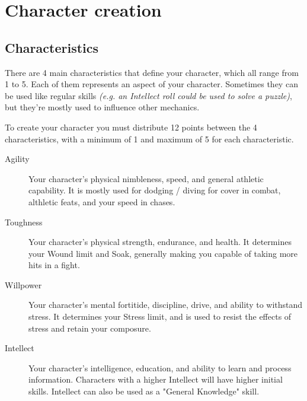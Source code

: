 \chapter{Character creation}

\section{Characteristics} \label{characteristics}


There are 4 main characteristics that define your character, which all range from 1 to 5. 
Each of them represents an aspect of your character. Sometimes they can be used like regular skills \textit{(e.g. an Intellect roll could be used to solve a puzzle)}, 
but they're mostly used to influence other mechanics. 

To create your character you must distribute 12 points between the 4 characteristics, 
with a minimum of 1 and maximum of 5 for each characteristic.

\begin{description}
    \item[Agility] 
    Your character's physical nimbleness, speed, and general athletic capability.
    It is mostly used for dodging / diving for cover in combat, althletic feats, and your speed in chases.

    \item[Toughness] 
    Your character's physical strength, endurance, and health.
    It determines your Wound limit and Soak, generally making you capable of taking more hits in a fight.

    \item[Willpower]
    Your character's mental fortitide, discipline, drive, and ability to withstand stress.
    It determines your Stress limit, and is used to resist the effects of stress and retain your composure.
    
    \item[Intellect]
    Your character's intelligence, education, and ability to learn and process information.
    Characters with a higher Intellect will have higher initial skills. 
    Intellect can also be used as a "General Knowledge" skill.
\end{description}

